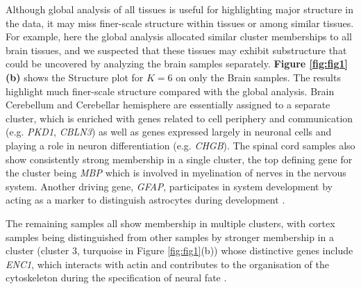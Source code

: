 Although global analysis of all tissues is useful for highlighting major structure in the data, it may miss finer-scale structure within tissues or among similar tissues. For example, here the global analysis allocated similar cluster memberships to all brain tissues,  and we suspected that these tissues may exhibit substructure that could be uncovered by analyzing the brain samples separately.  \textbf{Figure \ref{fig:fig1}(b)} shows the Structure plot for $K=6$ on only the Brain samples. The results highlight much finer-scale structure compared with the global analysis. Brain Cerebellum and Cerebellar hemisphere are essentially assigned to a separate cluster, which is enriched with genes related to cell periphery and communication (e.g. \textit{PKD1}, \textit{CBLN3}) as well as genes expressed largely in neuronal cells and playing a role in neuron differentiation (e.g. \textit{CHGB}). The spinal cord samples also show consistently strong membership in a single cluster, the top defining gene for the cluster being \textit{MBP} which is involved in myelination of nerves in the nervous system\cite{Hu2016}.  Another driving gene, \textit{GFAP}, participates in system development by acting as a marker to distinguish astrocytes during development \cite{Baba1997}. 



The remaining samples all show membership in multiple clusters, with cortex samples being distinguished from other samples by stronger membership in a cluster (cluster 3, turquoise in Figure \ref{fig:fig1}(b)) whose distinctive genes include \textit{ENC1}, which  interacts with actin and contributes to the organisation of the cytoskeleton during the specification of neural fate \cite{Hernandez1997}.



